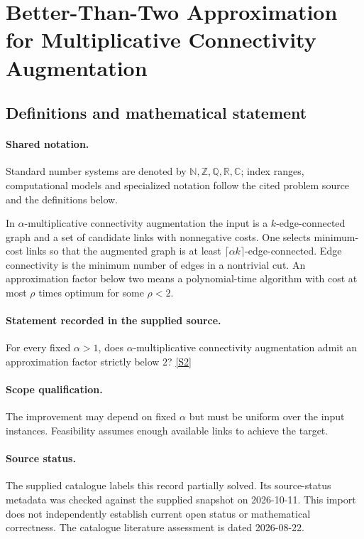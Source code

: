 \documentclass[11pt]{article}
\newcommand{\sref}[2]{\hyperlink{source:#1:#2}{[S#2]}}
\begin{document}
\section{Better-Than-Two Approximation for Multiplicative Connectivity Augmentation}\label{statement}

\subsection{Definitions and mathematical statement}

\paragraph{Shared notation.}Standard number systems are denoted by $\mathbb N,\mathbb Z,\mathbb Q,\mathbb R,\mathbb C$; index ranges, computational models and specialized notation follow the cited problem source and the definitions below.


In $\alpha$-multiplicative connectivity augmentation the input is a $k$-edge-connected graph and a set of candidate links with nonnegative costs. One selects minimum-cost links so that the augmented graph is at least $\lceil\alpha k\rceil$-edge-connected. Edge connectivity is the minimum number of edges in a nontrivial cut. An approximation factor below two means a polynomial-time algorithm with cost at most $\rho$ times optimum for some $\rho<2$.
\paragraph{Statement recorded in the supplied source.}
For every fixed $\alpha>1$, does $\alpha$-multiplicative connectivity augmentation admit an approximation factor strictly below $2$? \sref{statement}{2}
\paragraph{Scope qualification.}
The improvement may depend on fixed $\alpha$ but must be uniform over the input instances. Feasibility assumes enough available links to achieve the target.
\paragraph{Source status.}
The supplied catalogue labels this record partially solved. Its source-status metadata was checked against the supplied snapshot on 2026-10-11. This import does not independently establish current open status or mathematical correctness. The catalogue literature assessment is dated 2026-08-22.
\end{document}
